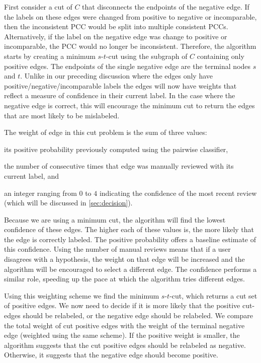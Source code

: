 First consider a cut of $C$ that disconnects the endpoints of the negative edge.
If the labels on these edges were changed from positive to negative or incomparable, then the inconsistent PCC
  would be split into multiple consistent PCCs.
Alternatively, if the label on the negative edge was change to positive or incomparable, the PCC would no longer
  be inconsistent.
Therefore, the algorithm starts by creating a minimum $s$-$t$-cut using the subgraph of $C$ containing only
  positive edges.
The endpoints of the single negative edge are the terminal nodes $s$ and $t$.
Unlike in our preceding discussion where the edges only have positive/negative/incomparable labels the edges will
  now have weights that reflect a measure of confidence in their current label.
In the case where the negative edge is correct, this will encourage the minimum cut to return the edges that are
  most likely to be mislabeled.

The weight of edge in this cut problem is the sum of three values:
\begin{enumln}
    \item its positive probability previously computed using the pairwise classifier,

    \item the number of consecutive times that edge was manually reviewed with
        its current label, and

    \item an integer ranging from $0$ to $4$ indicating the confidence of the most recent review (which will be
      discussed in \cref{sec:decision}).
\end{enumln}
Because we are using a minimum cut, the algorithm will find the lowest confidence of these edges.
The higher each of these values is, the more likely that the edge is correctly labeled.
The positive probability offers a baseline estimate of this confidence.
Using the number of manual reviews means that if a user disagrees with a hypothesis, the weight on that edge will
  be increased and the algorithm will be encouraged to select a different edge.
The confidence performs a similar role, speeding up the pace at which the algorithm tries different edges.

Using this weighting scheme we find the minimum $s$-$t$-cut, which returns a cut set of positive edges.
We now need to decide if it is more likely that the positive cut-edges should be relabeled, or the negative edge
  should be relabeled.
We compare the total weight of cut positive edges with the weight of the terminal negative edge (weighted using
  the same scheme).
If the positive weight is smaller, the algorithm suggests that the cut positive edges should be relabeled as
  negative.
Otherwise, it suggests that the negative edge should become positive.

